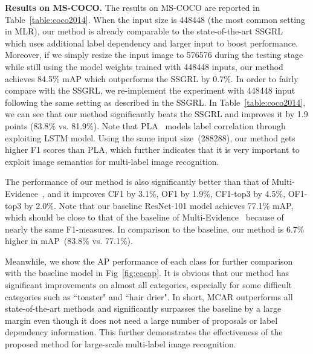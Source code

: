 \documentclass[journal]{IEEEtran}
\begin{document}
\noindent \textbf{Results on MS-COCO.}
The results on MS-COCO are reported in Table~\ref{table:coco2014}. When the input size is 448448 (the most common setting in MLR), our method is already comparable to the state-of-the-art SSGRL~\cite{chenlearning} which uses additional label dependency and larger input to boost performance. Moreover, if we simply resize the input image to 576576 during the testing stage while still using the model weights trained with 448448 inputs, our method achieves 84.5\% mAP which outperforms the SSGRL by 0.7\%.
In order to fairly compare with the SSGRL, we re-implement the experiment with 448448 input following the same setting as described in the SSGRL. In Table~\ref{table:coco2014}, we can see that our method significantly beats the SSGRL and improves it by 1.9 points (83.8\% vs. 81.9\%). Note that PLA~\cite{yazici2020orderless} models label correlation through exploiting LSTM model. Using the same input size~(288288), our method gets higher F1 scores than PLA, which further indicates that it is very important to exploit image semantics for multi-label image recognition.

The performance of our method is also significantly better than that of Multi-Evidence~\cite{ge2018multi}, and it improves CF1 by 3.1\%, OF1 by 1.9\%, CF1-top3 by 4.5\%, OF1-top3 by 2.0\%.  
Note that our baseline ResNet-101 model achieves 77.1\% mAP, which should be close to that of the baseline of Multi-Evidence~\cite{ge2018multi} because of nearly the same F1-measures. 
In comparison to the baseline, our method is 6.7\% higher in mAP~(83.8\% vs. 77.1\%).

Meanwhile, we show the AP performance of each class for further comparison with the baseline model in Fig~\ref{fig:cocap}. It is obvious that our method has significant improvements on almost all categories, especially for some difficult categories such as ``toaster" and ``hair drier". In short, MCAR outperforms all state-of-the-art methods and significantly surpasses the baseline by a large margin even though it does not need a large number of proposals or label dependency information. This further demonstrates the effectiveness of the proposed method for large-scale multi-label image recognition. 
\end{document}
